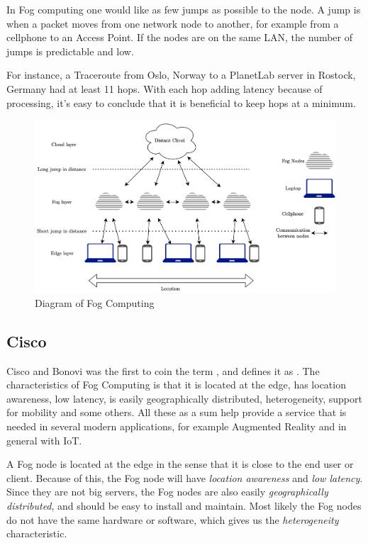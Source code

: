 In Fog computing one would like as few jumps as possible to the node. A jump is when a packet moves from one network node to another, for example from a cellphone to an Access Point. If the nodes are on the same LAN, the number of jumps is predictable and low.

For instance, a Traceroute\cite{noauthor_traceroute68_nodate} from Oslo, Norway to a PlanetLab server in Rostock, Germany had at least 11 hops. With each hop adding latency because of processing, it’s easy to conclude that it is beneficial to keep hops at a minimum.

\begin{figure}[t]
    \centering
    \includegraphics[scale=0.6]{chapters/2_background/figures/Fog.png}
    \caption{Diagram of Fog Computing}
    \label{fig:FogDiagram}
\end{figure}

\subsection{Cisco}
Cisco\cite{bonomi_fog_nodate} and Bonovi was the first to coin the term , and defines it as .  The characteristics of Fog Computing is that it is located at the edge, has location awareness, low latency, is easily geographically distributed, heterogeneity, support for mobility and some others. All these as a sum help provide a service that is needed in several modern applications, for example Augmented Reality and in general with IoT.

A Fog node is located at the edge in the sense that it is close to the end user or client. Because of this, the Fog node will have \textit{location awareness} and \textit{low latency}. Since they are not big servers, the Fog nodes are also easily \textit{geographically distributed}, and should be easy to install and maintain. Most likely the Fog nodes do not have the same hardware or software, which gives us the \textit{heterogeneity} characteristic. 

